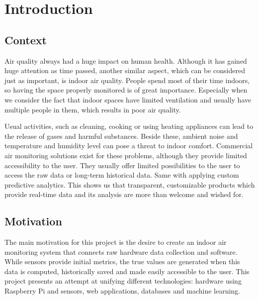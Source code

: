 
\chapter{Introduction}
\label{ch:introduction}

\section{Context}
\label{sec:context}

Air quality always had a huge impact on human health. Although it has gained huge attention as
time passed, another similar aspect, which can be considered just as important, is indoor air
quality. People spend most of their time indoors, so having the space properly monitored is of
great importance. Especially when we consider the fact that indoor spaces have limited
ventilation and usually have multiple people in them, which results in poor air quality.

Usual activities, such as cleaning, cooking or using heating appliances can lead to the release
of gases and harmful substances. Beside these, ambient noise and temperature and humidity level
can pose a threat to indoor comfort. Commercial air monitoring solutions exist for these
problems, although they provide limited accessibility to the user. They usually offer limited
possibilities to the user to access the raw data or long-term historical data. Same with
applying custom predictive analytics. This shows us that transparent, customizable products
which provide real-time data and its analysis are more than welcome and wished for.

\section{Motivation}
\label{sec:motivation}

The main motivation for this project is the desire to create an indoor air monitoring system
that connects raw hardware data collection and software. While sensors provide initial metrics,
the true values are generated when this data is computed, historically saved and made easily
accessible to the user. This project presents an attempt at unifying different technologies:
hardware using Raspberry Pi and sensors, web applications, databases and machine learning.

